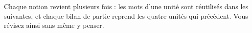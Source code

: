 

\vspace{4mm}
\begin{astuce}
Chaque notion revient plusieurs fois : les mots d'une unité sont réutilisés dans les suivantes,
et chaque bilan de partie reprend les quatre unités qui précèdent. Vous révisez ainsi sans même
y penser.
\end{astuce}
